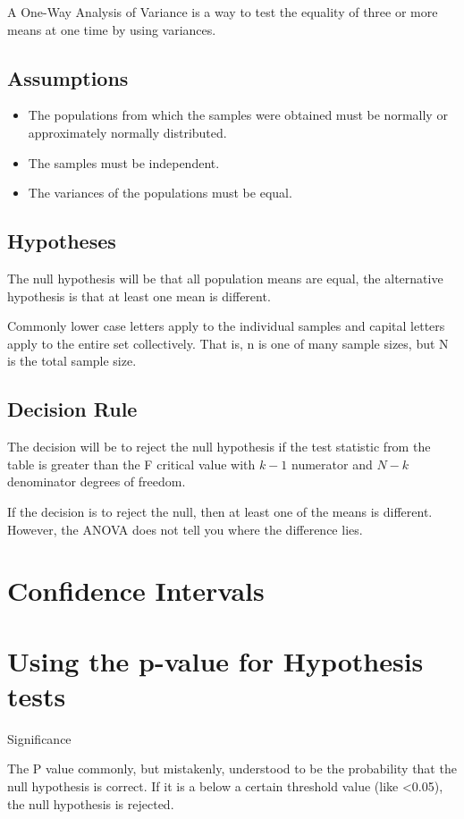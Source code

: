 \documentclass[12pt, a4paper]{report}
\begin{document}
A One-Way Analysis of Variance is a way to test the equality of three or more means at one time by using variances.

\subsection{Assumptions}
\begin{itemize}\item The populations from which the samples were obtained must be normally or approximately normally distributed.
\item The samples must be independent.
\item The variances of the populations must be equal.
\end{itemize}
\subsection{Hypotheses}
The null hypothesis will be that all population means are equal, the alternative hypothesis is that at least one mean is different.

 Commonly lower case letters apply to the individual samples and capital letters apply to the entire set collectively. That is, n is one of many sample sizes, but N is the total sample size.

\subsection{Decision Rule}
The decision will be to reject the null hypothesis if the test statistic from the table is greater than the F critical value with $k-1$ numerator and $N-k$ denominator degrees of freedom.

If the decision is to reject the null, then at least one of the means is different. However, the ANOVA does not tell you where the difference lies.


\newpage


\section{Confidence Intervals }
\section{Using the p-value for Hypothesis tests}

Significance

The P value  commonly, but mistakenly, understood to be the probability that the null hypothesis is correct. If it is a below a certain threshold value (like <0.05), the null hypothesis is rejected.
\end{document}
